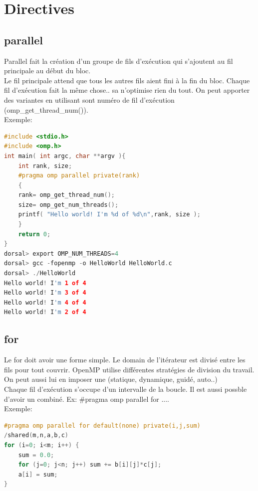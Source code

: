 \documentclass[oneside]{book}
\begin{document}
\section{Directives}
\subsection{parallel}
Parallel fait la création d'un groupe de fils d'exécution qui s'ajoutent au fil principale au début du bloc.\\

Le fil principale attend que tous les autres fils aient fini à la fin du bloc. Chaque fil d'exécution fait la même chose.. sa n'optimise rien du tout. On peut apporter des variantes en utilisant sont numéro de fil d'exécution (omp\_get\_thread\_num()).\\
Exemple:
\begin{lstlisting}[language=c]
#include <stdio.h>
#include <omp.h>
int main( int argc, char **argv ){
	int rank, size;
	#pragma omp parallel private(rank)
	{
	rank= omp_get_thread_num();
	size= omp_get_num_threads();
	printf( "Hello world! I'm %d of %d\n",rank, size );
	}
	return 0;
}
dorsal> export OMP_NUM_THREADS=4
dorsal> gcc -fopenmp -o HelloWorld HelloWorld.c
dorsal> ./HelloWorld
Hello world! I'm 1 of 4
Hello world! I'm 3 of 4
Hello world! I'm 4 of 4
Hello world! I'm 2 of 4

\end{lstlisting}
\subsection{for}
Le for doit avoir une forme simple. Le domain de l'itérateur est divisé entre les fils pour tout couvrir. OpenMP utilise différentes stratégies de division du travail. On peut aussi lui en imposer une (statique, dynamique, guidé, auto..)\\

Chaque fil d'exécution s'occupe d'un intervalle de la boucle. Il est aussi possble d'avoir un combiné. Ex: \#pragma omp parallel for ....\\
Exemple:
\begin{lstlisting}[language=c]
#pragma omp parallel for default(none) private(i,j,sum)
/shared(m,n,a,b,c)
for (i=0; i<m; i++) {
	sum = 0.0;
	for (j=0; j<n; j++) sum += b[i][j]*c[j];
	a[i] = sum;
}
\end{lstlisting}
\end{document}
